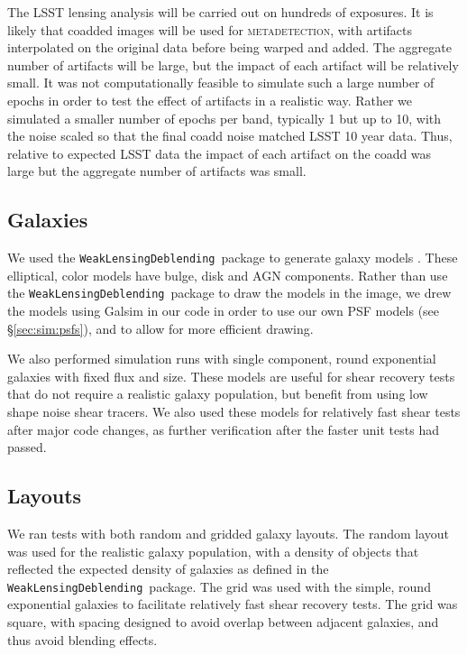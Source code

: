 \documentclass[twocolumn,twocolappendix,astrosym]{openjournal}
\newcommand{\descwl}{\texttt{WeakLensingDeblending}}
\newcommand{\mdet}{\textsc{metadetection}}
\begin{document}
The LSST lensing analysis will be carried out on hundreds of exposures.  It is
likely that coadded images will be used for \mdet, with artifacts interpolated
on the original data before being warped and added.  The aggregate number of
artifacts will be large, but the impact of each artifact will be relatively
small.  It was not computationally feasible to simulate such a large number of
epochs in order to test the effect of artifacts in a realistic way.  Rather we
simulated a smaller number of epochs per band, typically 1 but up to 10, with
the noise scaled so that the final coadd noise matched LSST 10 year data.
Thus, relative to expected LSST data the impact of each artifact on the coadd
was large but the aggregate number of artifacts was small.

\subsection{Galaxies} \label{sec:sim:galaxies}

We used the \descwl\ package to generate galaxy models
\citep{DESCWLSanchez2021}.  These elliptical, color models have bulge, disk and
AGN components.  Rather than use the \descwl\ package to draw the models in the
image, we drew the models using Galsim in our code in order to use our own PSF
models (see \S \ref{sec:sim:psfs}), and to allow for more efficient drawing.

We also performed simulation runs with single component, round exponential
galaxies with fixed flux and size.  These models are useful for shear recovery
tests that do not require a realistic galaxy population, but benefit from using
low shape noise shear tracers.  We also used these models for relatively fast
shear tests after major code changes, as further verification after the faster
unit tests had passed.

\subsection{Layouts} \label{sec:sim:layouts}

We ran tests with both random and gridded galaxy layouts.  The random layout
was used for the realistic galaxy population, with a density of objects that
reflected the expected density of galaxies as defined in the \descwl\ package.
The grid was used with the simple, round exponential galaxies to facilitate
relatively fast shear recovery tests.  The grid was square, with spacing
designed to avoid overlap between adjacent galaxies, and thus avoid blending
effects.
\end{document}
